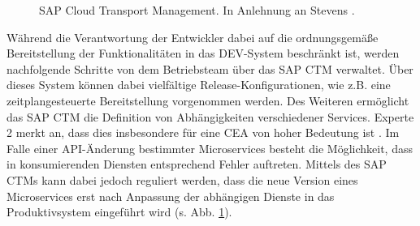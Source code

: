 \begin{center}
	\begin{figure}[H]
		\centering
		\caption[SAP Cloud Transport Management]{SAP Cloud Transport Management. In Anlehnung an Stevens \cite{.20230327}.}
		\label{fig:CTM}
	\end{figure}
\end{center}
\vspace*{-15mm}
Während die Verantwortung der Entwickler dabei auf die ordnungsgemäße Bereitstellung der Funktionalitäten in das DEV-System beschränkt ist, werden nachfolgende Schritte von dem Betriebsteam über das SAP CTM verwaltet. Über dieses System können dabei vielfältige Release-Konfigurationen, wie z.B. eine zeitplangesteuerte Bereitstellung vorgenommen werden. Des Weiteren ermöglicht das SAP CTM die Definition von Abhängigkeiten verschiedener Services. Experte 2 merkt an, dass dies insbesondere für eine CEA von hoher Bedeutung ist \cite[Z. 67 ff.]{ProductManagerSAPHyperspaceCICD.}. Im Falle einer API-Änderung bestimmter Microservices besteht die Möglichkeit, dass in konsumierenden Diensten entsprechend Fehler auftreten. Mittels des SAP CTMs kann dabei jedoch reguliert werden, dass die neue Version eines Microservices erst nach Anpassung der abhängigen Dienste in das Produktivsystem eingeführt wird (s. Abb. \ref{fig:CTM}).
